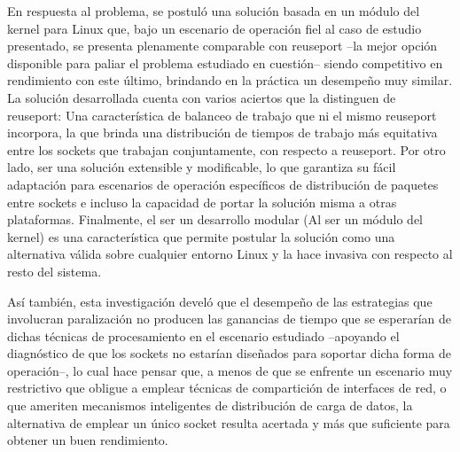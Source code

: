 \begin{conclusion}
 
En respuesta al problema, se postuló una solución basada en un módulo del kernel para Linux que, bajo un escenario de operación fiel al caso de estudio presentado, se presenta plenamente comparable con reuseport --la mejor opción disponible para paliar el problema estudiado en cuestión-- siendo competitivo en rendimiento con este último, brindando en la práctica un desempeño muy similar. La solución desarrollada cuenta con varios aciertos que la distinguen de reuseport: Una característica de balanceo de trabajo que ni el mismo reuseport incorpora, la que brinda una distribución de tiempos de trabajo más equitativa entre los sockets que trabajan conjuntamente, con respecto a reuseport. Por otro lado, ser una solución extensible y modificable, lo que garantiza su fácil adaptación para escenarios de operación específicos de distribución de paquetes entre sockets e incluso la capacidad de portar la solución misma a otras plataformas. Finalmente, el ser un desarrollo modular (Al ser un módulo del kernel) es una característica que permite postular la solución como una alternativa válida sobre cualquier entorno Linux y la hace invasiva con respecto al resto del sistema.  
 
 
Así también, esta investigación develó que el desempeño de las estrategias que involucran paralización no producen las ganancias de tiempo que se esperarían de dichas técnicas de procesamiento en el escenario estudiado --apoyando el diagnóstico de que los sockets no estarían diseñados para soportar dicha forma de operación--, lo cual hace pensar que, a menos de que se enfrente un escenario muy restrictivo que obligue a emplear técnicas de compartición de interfaces de red, o que ameriten mecanismos inteligentes de distribución de carga de datos, la alternativa de emplear un único socket resulta acertada y más que suficiente para obtener un buen rendimiento. 



\end{conclusion}
